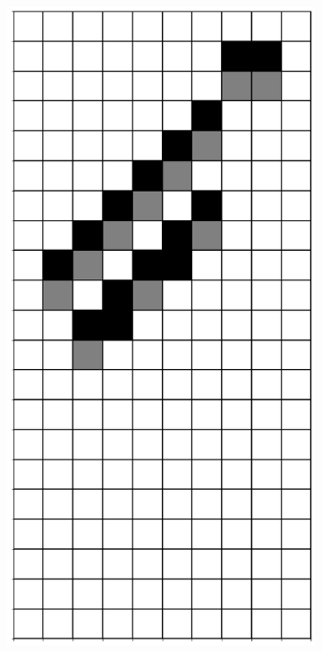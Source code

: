 \documentclass[12pt]{article}
\numberwithin{figure}{section} %
\begin{document}
\begin{figure}[H]
\begin{subfigure}{0.3\textwidth}
     		\subcaption{}
   	\end{subfigure}
        \begin{subfigure}{0.3\textwidth}
     		\centering
     		\includegraphics[angle=270,width=\linewidth]{Section4/23.8}

\end{subfigure}
\end{figure}
\end{document}
